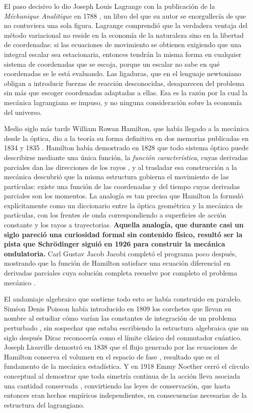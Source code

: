     El paso decisivo lo dio Joseph Louis Lagrange con la publicación de la \textit{Méchanique Analitique} en 1788 \citep{lagrange1788mecanique}, un libro del que su autor se enorgullecía de que no contuviera una sola figura. Lagrange comprendió que la verdadera ventaja del método variacional no reside en la economía de la naturaleza sino en la libertad de coordenadas: si las ecuaciones de movimiento se obtienen exigiendo que una integral escalar sea estacionaria, entonces tendrán la misma forma en cualquier sistema de coordenadas que se escoja, porque un escalar no sabe en qué coordenadas se le está evaluando. Las ligaduras, que en el lenguaje newtoniano obligan a introducir fuerzas de reacción desconocidas, desaparecen del problema sin más que escoger coordenadas adaptadas a ellas. Esa es la razón por la cual la mecánica lagrangiana se impuso, y no ninguna consideración sobre la economía del universo.

    Medio siglo más tarde William Rowan Hamilton, que había llegado a la mecánica desde la óptica, dio a la teoría su forma definitiva en dos memorias publicadas en 1834 y 1835 \citep{hamilton1834general, hamilton1835second}. Hamilton había demostrado en 1828 que todo sistema óptico puede describirse mediante una única función, la \textit{función característica}, cuyas derivadas parciales dan las direcciones de los rayos \citep{hamilton1828theory}, y al trasladar esa construcción a la mecánica descubrió que la misma estructura gobierna el movimiento de las partículas: existe una función de las coordenadas y del tiempo cuyas derivadas parciales son los momentos. La analogía es tan precisa que Hamilton la formuló explícitamente como un diccionario entre la óptica geométrica y la mecánica de partículas, con los frentes de onda correspondiendo a superficies de acción constante y los rayos a trayectorias. \textbf{Aquella analogía, que durante casi un siglo pareció una curiosidad formal sin contenido físico, resultó ser la pista que Schrödinger siguió en 1926 para construir la mecánica ondulatoria.} Carl Gustav Jacob Jacobi completó el programa poco después, mostrando que la función de Hamilton satisface una ecuación diferencial en derivadas parciales cuya solución completa resuelve por completo el problema mecánico \citep{jacobi1866vorlesungen}.

    El andamiaje algebraico que sostiene todo esto se había construido en paralelo. Siméon Denis Poisson había introducido en 1809 los corchetes que llevan su nombre al estudiar cómo varían las constantes de integración de un problema perturbado \citep{poisson1809memoire}, sin sospechar que estaba escribiendo la estructura algebraica que un siglo después Dirac reconocería como el límite clásico del conmutador cuántico. Joseph Liouville demostró en 1838 que el flujo generado por las ecuaciones de Hamilton conserva el volumen en el espacio de fase \citep{liouville1838note}, resultado que es el fundamento de la mecánica estadística. Y en 1918 Emmy Noether cerró el círculo conceptual al demostrar que toda simetría continua de la acción lleva asociada una cantidad conservada \citep{noether1918invariante}, convirtiendo las leyes de conservación, que hasta entonces eran hechos empíricos independientes, en consecuencias necesarias de la estructura del lagrangiano.

